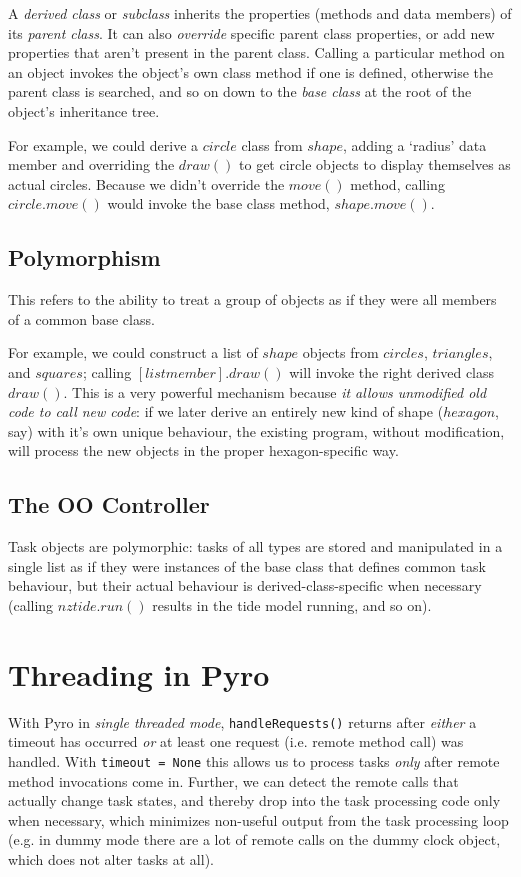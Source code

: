 \documentclass[11pt,a4paper]{report}
\begin{document}
A {\em derived class} or {\em subclass} inherits the properties (methods
and data members) of its {\em parent class}. It can also {\em override}
specific parent class properties, or add new properties that aren't
present in the parent class. Calling a particular method on an object
invokes the object's own class method if one is defined, otherwise the
parent class is searched, and so on down to the {\em base class} at the
root of the object's inheritance tree. 

For example, we could derive a $circle$ class from $shape$, adding a
`radius' data member and overriding the $draw()$ to get circle objects
to display themselves as actual circles.  Because we didn't override the
$move()$ method, calling $circle.move()$ would invoke the base class
method, $shape.move()$. 


\section{Polymorphism}

This refers to the ability to treat a group of objects as if they were
all members of a common base class.

For example, we could construct a list of $shape$ objects from
$circles$, $triangles$, and $squares$; calling $[list member].draw()$
will invoke the right derived class $draw()$. This is a very powerful
mechanism because {\em it allows unmodified old code to call new code}:
if we later derive an entirely new kind of shape ($hexagon$, say) with
it's own unique behaviour, the existing program, without modification,
will process the new objects in the proper hexagon-specific way.

\section{The OO Controller}

Task objects are polymorphic: tasks of all types are stored and
manipulated in a single list as if they were instances of the base class
that defines common task behaviour, but their actual behaviour is
derived-class-specific when necessary (calling $nztide.run()$ results in
the tide model running, and so on). 


\chapter{Threading in Pyro} \label{pyro-appendix}

With Pyro in {\em single threaded mode}, \verb#handleRequests()# returns
after {\em either} a timeout has occurred {\em or} at least one request
(i.e.  remote method call) was handled. With \verb#timeout = None# this
allows us to process tasks {\em only} after remote method invocations
come in.  Further, we can detect the remote calls that actually change
task states, and thereby drop into the task processing code only when
necessary, which minimizes non-useful output from the task processing
loop (e.g. in dummy mode there are a lot of remote calls on the dummy
clock object, which does not alter tasks at all). 
\end{document}
